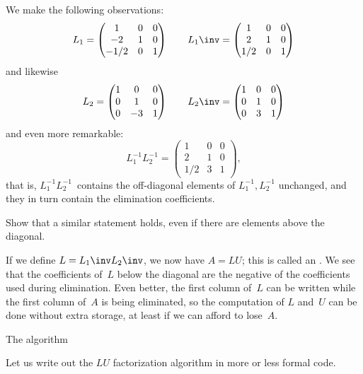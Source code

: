 We make the following observations:
  \[ 
  L_1=\left(
    \begin{matrix}
      1&0&0\\ -2&1&0\\ -1/2&0&1
    \end{matrix}\right)\qquad
  L_1\inv=\left(
    \begin{matrix}
      1&0&0\\ 2&1&0\\ 1/2&0&1
    \end{matrix}\right)
  \]
and likewise
  \[ L_2=\left(
    \begin{matrix}
      1&0&0\\ 0&1&0\\ 0&-3&1
    \end{matrix}\right)\qquad
  L_2\inv=\left(
    \begin{matrix}
      1&0&0\\ 0&1&0\\ 0&3&1
    \end{matrix}\right)
  \]
and even more remarkable:
  \[ L_1^{-1}L_2^{-1} = \left(
    \begin{matrix}
      1&0&0\\ 2&1&0\\ 1/2&3&1
    \end{matrix}\right),
  \]
that is, $L_1^{-1}L_2^{-1}$~contains the off-diagonal elements of
$L_1^{-1},L_2^{-1}$ unchanged, and they in turn contain the
elimination coefficients.
\begin{exercise}
  Show that a similar statement holds, even if there are elements
  above the diagonal.
\end{exercise}

If we define $L=L_1\inv L_2\inv$, we now have $A=LU$; this is called
an .
We see that the
coefficients of~$L$ below the diagonal
are the negative of the coefficients used during
elimination. Even better, the first column of~$L$ can be written while
the first column of~$A$ is being eliminated, so the computation of $L$
and~$U$ can be done without extra storage, at least if we can afford
to lose~$A$.

 {The algorithm}
\label{sec:lu-algorithm}

Let us write out the $LU$ factorization algorithm in more or less
formal code.

